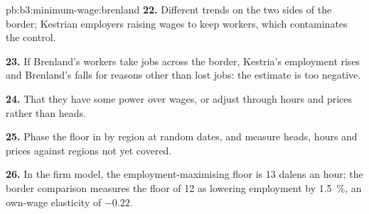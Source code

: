 \begin{solution}{pb:b3:minimum-wage:brenland}
\textbf{22.} Different trends on the two sides of the border; Kestrian employers raising
wages to keep workers, which contaminates the control.

\textbf{23.} If Brenland's workers take jobs across the border, Kestria's employment rises
and Brenland's falls for reasons other than lost jobs: the estimate is too negative.

\textbf{24.} That they have some power over wages, or adjust through hours and prices
rather than heads.

\textbf{25.} Phase the floor in by region at random dates, and measure heads, hours and
prices against regions not yet covered.

\textbf{26.} In the firm model, the employment-maximising floor is 13 dalens an hour; the
border comparison measures the floor of 12 as lowering employment by 1.5~\%, an own-wage
elasticity of $-0.22$.
\end{solution}
